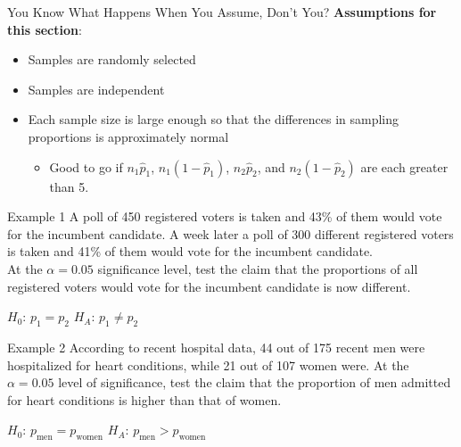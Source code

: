 \documentclass[t]{beamer}
\begin{document}
\begin{frame}{You Know What Happens When You Assume, Don't You?}
\textbf{Assumptions for this section}:
\begin{itemize}
	\item<2-> Samples are randomly selected
	\item<3-> Samples are independent
	\item<4-> Each sample size is large enough so that the differences in sampling proportions is approximately normal
	\begin{itemize}
	\item<5-> Good to go if $n_1\hat{p}_1$, $n_1(1-\hat{p}_1)$, $n_2\hat{p}_2$, and $n_2(1-\hat{p}_2)$ are each greater than 5.
	\end{itemize}
\end{itemize}
\end{frame}

\begin{frame}{Example 1}
A poll of 450 registered voters is taken and 43\% of them would vote for the incumbent candidate. A week later a poll of 300 different registered voters is taken and 41\% of them would vote for the incumbent candidate. \newline\\

At the $\alpha = 0.05$ significance level, test the claim that the proportions of all registered voters would vote for the incumbent candidate is now different.	\newline\\	\pause

$H_0: \, p_1 = p_2$ \newline	\pause
$H_A: \, p_1 \neq p_2$
\end{frame}

\begin{frame}{Example 2}
According to recent hospital data, 44 out of 175 recent men were hospitalized for heart conditions, while 21 out of 107 women were. At the $\alpha = 0.05$ level of significance, test the claim that the proportion of men admitted for heart conditions is higher than that of women.	\newline\\	\pause

$H_0: \, p_{\text{men}} = p_{\text{women}}$ \newline \pause
$H_A: \, p_{\text{men}} > p_{\text{women}}$
\end{frame}
\end{document}
